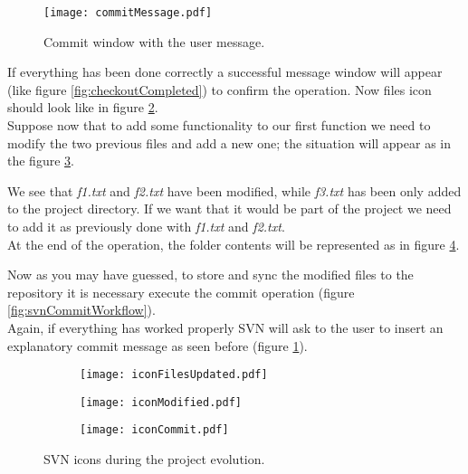\begin{figure}[ht!]
    \centering
    \texttt{[image: commitMessage.pdf]}
    \caption{Commit window with the user message.}
    \label{fig:commitMessage}
\end{figure}


If everything has been done correctly a successful message window will appear (like figure \ref{fig:checkoutCompleted}) to confirm the operation. Now files icon should look like in figure \ref{fig:iconFilesUpdated}.\\

Suppose now that to add some functionality to our first function we need to modify the two previous files and add a new one; the situation will appear as in the figure \ref{fig:iconModified}.

We see that \textit{f1.txt} and \textit{f2.txt} have been modified, while \textit{f3.txt} has been only added to the project directory. If we want that it would be part of the project we need to add it as previously done with \textit{f1.txt} and \textit{f2.txt}.\\

At the end of the operation, the folder contents will be represented as in figure \ref{fig:iconCommit}.

Now as you may have guessed, to store and sync the modified files to the repository it is necessary execute the commit operation (figure \ref{fig:svnCommitWorkflow}).\\

Again, if everything has worked properly SVN will ask to the user to insert an explanatory commit message as seen before (figure \ref{fig:commitMessage}).

\begin{figure}[htbp]
\begin{subfigure}{0.33\textwidth}
  \centering
  \texttt{[image: iconFilesUpdated.pdf]}
  \caption{} %
  \label{fig:iconFilesUpdated}
\end{subfigure}%
\begin{subfigure}{0.33\textwidth}
  \centering
  \texttt{[image: iconModified.pdf]}
  \caption{}%
  \label{fig:iconModified}
\end{subfigure}
\begin{subfigure}{0.33\textwidth}
  \centering
  \texttt{[image: iconCommit.pdf]}
  \caption{}%
  \label{fig:iconCommit}
\end{subfigure}
\caption{SVN icons during the project evolution.}
\label{fig:systemIcons_3}
\end{figure}

